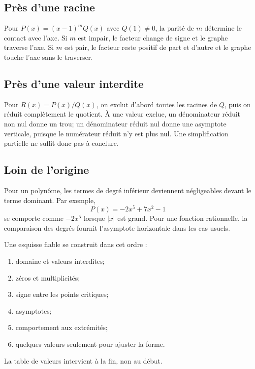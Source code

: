 \subsection{Près d'une racine}
Pour $P(x)=(x-1)^mQ(x)$ avec $Q(1)\ne0$, la parité de $m$ détermine le contact avec l'axe. Si $m$ est impair, le facteur change de signe et le graphe traverse l'axe. Si $m$ est pair, le facteur reste positif de part et d'autre et le graphe touche l'axe sans le traverser.

\begin{center}
\qquad
{}
\end{center}

\subsection{Près d'une valeur interdite}
Pour $R(x)=P(x)/Q(x)$, on exclut d'abord toutes les racines de $Q$, puis on réduit complètement le quotient. À une valeur exclue, un dénominateur réduit non nul donne un trou; un dénominateur réduit nul donne une asymptote verticale, puisque le numérateur réduit n'y est plus nul. Une simplification partielle ne suffit donc pas à conclure.

\subsection{Loin de l'origine}
Pour un polynôme, les termes de degré inférieur deviennent négligeables devant le terme dominant. Par exemple,
\[
P(x)=-2x^5+7x^2-1
\]
se comporte comme $-2x^5$ lorsque $|x|$ est grand. Pour une fonction rationnelle, la comparaison des degrés fournit l'asymptote horizontale dans les cas usuels.

\begin{visualbox}
Une esquisse fiable se construit dans cet ordre :
\begin{enumerate}
\item domaine et valeurs interdites;
\item zéros et multiplicités;
\item signe entre les points critiques;
\item asymptotes;
\item comportement aux extrémités;
\item quelques valeurs seulement pour ajuster la forme.
\end{enumerate}
La table de valeurs intervient à la fin, non au début.
\end{visualbox}


